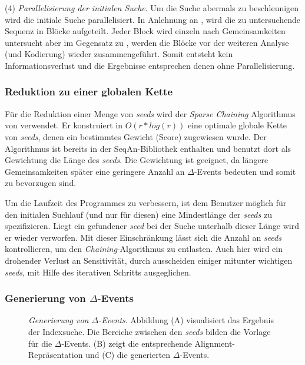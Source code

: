 \documentclass[12pt]{article}
\begin{document}
(4) \emph{Parallelisierung der initialen Suche}. Um die Suche abermals zu beschleunigen wird die initiale Suche parallelisiert. In Anlehnung an \cite{rani14new}, wird die zu untersuchende Sequenz in Blöcke aufgeteilt. Jeder Block wird einzeln nach Gemeinsamkeiten untersucht aber im Gegensatz zu \cite{rani14new}, werden die Blöcke vor der weiteren Analyse (und Kodierung) wieder zusammengeführt. Somit entsteht kein Informationsverlust und die Ergebnisse entsprechen denen ohne Parallelisierung.

\subsubsection{Reduktion zu einer globalen Kette}
Für die Reduktion einer Menge von \textit{seeds} wird der \textit{Sparse Chaining} Algorithmus von \cite{gusfield97algorithms} verwendet. Er konstruiert in $O(r*log(r))$ eine optimale globale Kette von \textit{seeds}, denen ein bestimmtes Gewicht (Score) zugewiesen wurde. Der Algorithmus ist bereits in der SeqAn-Bibliothek \cite{doering08seqan} enthalten und benutzt dort als Gewichtung die Länge des \textit{seeds}. Die Gewichtung ist geeignet, da längere Gemeinsamkeiten später eine geringere Anzahl an $\Delta$-Events bedeuten und somit zu bevorzugen sind.

Um die Laufzeit des Programmes zu verbessern, ist dem Benutzer möglich für den initialen Suchlauf (und nur für diesen) eine Mindestlänge der \textit{seeds} zu spezifizieren. Liegt ein gefundener \textit{seed} bei der Suche unterhalb dieser Länge wird er wieder verworfen. Mit dieser Einschränkung lässt sich die Anzahl an \textit{seeds} kontrollieren, um den \textit{Chaining}-Algorithmus zu entlasten. Auch hier wird ein drohender Verlust an Sensitivität, durch ausscheiden einiger mitunter wichtigen \textit{seeds}, mit Hilfe des iterativen Schritts ausgeglichen.

\subsubsection{Generierung von $\Delta$-Events}

\begin{figure}[t]
\caption{\label{fig:deltaevent}\emph{Generierung von $\Delta$-Events}. Abbildung (A) visualisiert das Ergebnis der Indexsuche. Die Bereiche zwischen den \textit{seeds} bilden die Vorlage für die $\Delta$-Events. (B) zeigt die entsprechende Alignment-Repräsentation und (C) die generierten $\Delta$-Events.  }
\end{figure}
\end{document}
